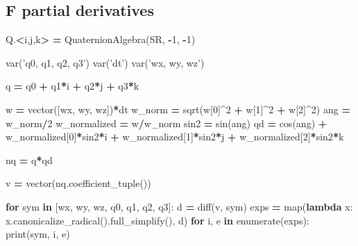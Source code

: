 \documentclass[12pt,]{article}
\newenvironment{Shaded}{\begin{snugshade}}{\end{snugshade}}
\newcommand{\KeywordTok}[1]{\textcolor[rgb]{0.13,0.29,0.53}{\textbf{#1}}}
\newcommand{\DecValTok}[1]{\textcolor[rgb]{0.00,0.00,0.81}{#1}}
\newcommand{\StringTok}[1]{\textcolor[rgb]{0.31,0.60,0.02}{#1}}
\newcommand{\ControlFlowTok}[1]{\textcolor[rgb]{0.13,0.29,0.53}{\textbf{#1}}}
\newcommand{\OperatorTok}[1]{\textcolor[rgb]{0.81,0.36,0.00}{\textbf{#1}}}
\newcommand{\BuiltInTok}[1]{#1}
\newcommand{\NormalTok}[1]{#1}
\begin{document}
\subsection{F partial derivatives}\label{f-partial-derivatives}

\begin{Shaded}
\begin{Highlighting}[]
\NormalTok{Q.}\OperatorTok{<}\NormalTok{i,j,k}\OperatorTok{>} \OperatorTok{=}\NormalTok{ QuaternionAlgebra(SR, }\OperatorTok{-}\DecValTok{1}\NormalTok{, }\OperatorTok{-}\DecValTok{1}\NormalTok{)}

\NormalTok{var(}\StringTok{'q0, q1, q2, q3'}\NormalTok{)}
\NormalTok{var(}\StringTok{'dt'}\NormalTok{)}
\NormalTok{var(}\StringTok{'wx, wy, wz'}\NormalTok{)}

\NormalTok{q }\OperatorTok{=}\NormalTok{ q0 }\OperatorTok{+}\NormalTok{ q1}\OperatorTok{*}\NormalTok{i }\OperatorTok{+}\NormalTok{ q2}\OperatorTok{*}\NormalTok{j }\OperatorTok{+}\NormalTok{ q3}\OperatorTok{*}\NormalTok{k}

\NormalTok{w }\OperatorTok{=}\NormalTok{ vector([wx, wy, wz])}\OperatorTok{*}\NormalTok{dt}
\NormalTok{w_norm }\OperatorTok{=}\NormalTok{ sqrt(w[}\DecValTok{0}\NormalTok{]}\OperatorTok{^}\DecValTok{2} \OperatorTok{+}\NormalTok{ w[}\DecValTok{1}\NormalTok{]}\OperatorTok{^}\DecValTok{2} \OperatorTok{+}\NormalTok{ w[}\DecValTok{2}\NormalTok{]}\OperatorTok{^}\DecValTok{2}\NormalTok{)}
\NormalTok{ang }\OperatorTok{=}\NormalTok{ w_norm}\OperatorTok{/}\DecValTok{2}
\NormalTok{w_normalized }\OperatorTok{=}\NormalTok{ w}\OperatorTok{/}\NormalTok{w_norm}
\NormalTok{sin2 }\OperatorTok{=}\NormalTok{ sin(ang)}
\NormalTok{qd }\OperatorTok{=}\NormalTok{ cos(ang) }\OperatorTok{+}\NormalTok{ w_normalized[}\DecValTok{0}\NormalTok{]}\OperatorTok{*}\NormalTok{sin2}\OperatorTok{*}\NormalTok{i }\OperatorTok{+}\NormalTok{ w_normalized[}\DecValTok{1}\NormalTok{]}\OperatorTok{*}\NormalTok{sin2}\OperatorTok{*}\NormalTok{j }\OperatorTok{+}\NormalTok{ w_normalized[}\DecValTok{2}\NormalTok{]}\OperatorTok{*}\NormalTok{sin2}\OperatorTok{*}\NormalTok{k}

\NormalTok{nq }\OperatorTok{=}\NormalTok{ q}\OperatorTok{*}\NormalTok{qd}

\NormalTok{v }\OperatorTok{=}\NormalTok{ vector(nq.coefficient_tuple())}

\ControlFlowTok{for}\NormalTok{ sym }\KeywordTok{in}\NormalTok{ [wx, wy, wz, q0, q1, q2, q3]:}
\NormalTok{    d }\OperatorTok{=}\NormalTok{ diff(v, sym)}
\NormalTok{    exps }\OperatorTok{=} \BuiltInTok{map}\NormalTok{(}\KeywordTok{lambda}\NormalTok{ x: x.canonicalize_radical().full_simplify(), d)}
    \ControlFlowTok{for}\NormalTok{ i, e }\KeywordTok{in} \BuiltInTok{enumerate}\NormalTok{(exps):}
        \BuiltInTok{print}\NormalTok{(sym, i, e) }
        
\end{Highlighting}
\end{Shaded}
\end{document}
